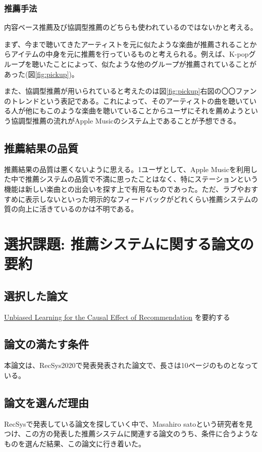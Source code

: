 \documentclass{jsarticle}
\begin{document}
\subsubsection{推薦手法}
内容ベース推薦及び協調型推薦のどちらも使われているのではないかと考える。
\par まず、今まで聴いてきたアーティストを元に似たような楽曲が推薦されることからアイテムの中身を元に推薦を行っているものと考えられる。例えば、K-popグループを聴いたことによって、似たような他のグループが推薦されていることがあった(図\ref{fig:pickup})。
\par また、協調型推薦が用いられていると考えたのは図\ref{fig:pickup}右図の〇〇ファンのトレンドという表記である。これによって、そのアーティストの曲を聴いている人が他にもこのような楽曲を聴いていることからユーザにそれを薦めようという協調型推薦の流れがApple Musicのシステム上であることが予想できる。
\subsection{推薦結果の品質}
推薦結果の品質は悪くないように思える。1ユーザとして、Apple Musicを利用した中で推薦システムの品質で不満に思ったことはなく、特にステーションという機能は新しい楽曲との出会いを探す上で有用なものであった。ただ、ラブやおすすめに表示しないといった明示的なフィードバックがどれくらい推薦システムの質の向上に活きているのかは不明である。
\section{選択課題: 推薦システムに関する論文の要約}
\subsection{選択した論文}
\href{https://dl.acm.org/doi/abs/10.1145/3383313.3412261?casa_token=GDpkscbOcbMAAAAA:YGw9kkw2rSXyqtcQCQzV24MrHLfdik8BdjHg2n_kYA9nuAs74NVUYd0_iVAadTANVpDtRuenkwGM}{Unbiased Learning for the Causal Effect of Recommendation}
を要約する
\subsection{論文の満たす条件}
本論文は、RecSys2020で発表発表された論文で、長さは10ページのものとなっている。
\subsection{論文を選んだ理由}
RecSysで発表している論文を探していく中で、Masahiro satoという研究者を見つけ、この方の発表した推薦システムに関連する論文のうち、条件に合うようなものを選んだ結果、この論文に行き着いた。
\end{document}
